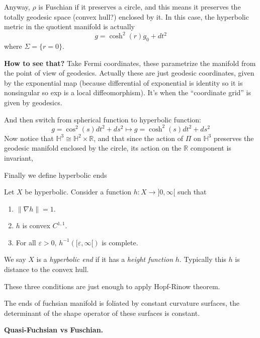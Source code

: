Anyway, $\rho$ is Fuschian if it preserves a
circle, and this means it preserves the
totally geodesic space (convex hull?)
enclosed by it. In this case, the hyperbolic
metric in the quotient manifold is actually
$$g=\cosh^2(r)g_0+dt^2$$
where $\Sigma=\{r=0\}$.

\medskip\noindent
{\bf How to see that?}
Take Fermi coordinates, these parametrize the
manifold from the point of view of geodesics.
Actually these are just geodesic coordinates,
given by the exponential map (because
differential of exponential is identity so it
is nonsingular so exp is a local
diffeomorphism). It's when the ``coordinate
grid'' is given by geodesics.

And then switch from spherical function to
hyperbolic function:
$$g=\cos^2(s)dt^2+ds^2\longmapsto
g=\cosh^2(s)dt^2+ds^2$$
Now notice that $\mathbb{H}^{3}\cong
\mathbb{H}^{2}\times \mathbb{R}$, and that
since the action of $\Pi$ on $\mathbb{H}^{3}$
preserves the geodesic manifold enclosed by
the circle, its action on the $\mathbb{R}$
component is invariant,

Finally we define hyperbolic ends

\begin{definition}
\label{definition-smith-hyperbolic-end}
Let $X$ be hyperbolic. Consider a function
$h:X\longrightarrow ]0,\infty[$ such that
\begin{enumerate}
\item $\|\nabla h\|=1$.
\item $h$ is convex $C^{1,1}$.
\item For all $\varepsilon>0$,
$h^{-1}([\varepsilon,\infty[)$ is complete.
\end{enumerate}
We say $X$ is a \textit{hyperbolic end} if it
has a \textit{height function} $h$. Typically
this $h$ is distance to the convex hull.
\end{definition}

\begin{remark}
\label{remark-smith-hopf-rinow}
These three conditions are just enough to
apply Hopf-Rinow theorem.
\end{remark}

\begin{remark}[Upshot]
\label{remark-smith-upshot-fuchsian-ends}
The ends of fuchsian manifold is foliated by
constant curvature surfaces, the determinant
of the shape operator of these surfaces is
constant.
\end{remark}

\medskip\noindent
{\bf Quasi-Fuchsian vs Fuschian.}

